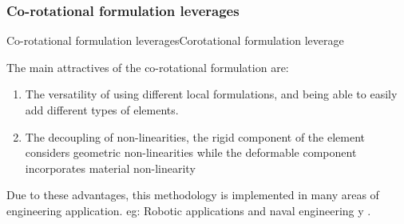 \documentclass{beamer}
\begin{document}
\subsubsection{Co-rotational formulation leverages}
\begin{frame}{Co-rotational formulation leverages}{Corotational formulation leverage}

The main attractives of the co-rotational formulation are:

 \begin{enumerate}
     \item The versatility of using different local formulations, and being able to easily add different types of elements.
     \pause
     \item The decoupling of non-linearities, the rigid component of the element considers geometric non-linearities while the deformable component incorporates material non-linearity
 \end{enumerate}
 \pause
 Due to these advantages, this methodology is implemented in many areas of engineering application. eg: Robotic applications and naval engineering  \cite{albino2018co} y \cite{asadi2019multibody}.

\end{frame}
\end{document}
